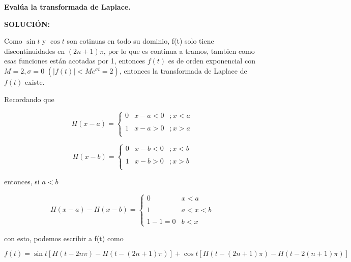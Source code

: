 \documentclass[12pt,a4paper]{article}
\begin{document}
\begin{enumerate}
    \textbf{Evalúa la transformada de Laplace.}
    
    \textbf{SOLUCIÓN:}
    
    Como $\sin{t}$ y $\cos{t}$ son cotinuas en todo su dominio, f(t) solo tiene discontinuidades en $(2n+1)\pi$, por lo que es continua a tramos, tambien como esas funciones están acotadas por 1, entonces $f(t)$ es de orden exponencial con $M=2,\sigma = 0$ $(|f(t)|<Me^{\sigma t}=2)$, entonces la transformada de Laplace de $f(t)$  existe.
    
    Recordando que 
    
    \begin{equation*}
        H(x-a)=\left\{ \begin{array}{lcc}
             0 &    x-a < 0 &; x < a \\
             \\ 1 &  x-a > 0 &; x > a\\
             \end{array}
        \right.
    \end{equation*}
    
    \begin{equation*}
        H(x-b)=\left\{ \begin{array}{lcc}
             0 &    x-b < 0 &; x < b \\
             \\ 1 &  x-b > 0 &; x > b\\
             \end{array}
        \right.
    \end{equation*}
    
    entonces, si $a<b$
    
    \begin{equation*}
        H(x-a)-H(x-b)=\left\{ \begin{array}{lcc}
             0 & x < a \\
             \\ 1  & a< x < b\\
             \\ 1-1=0 & b < x
             \end{array}
             \right.
    \end{equation*}
    
    con esto, podemos escribir a f(t) como 
    
    \begin{equation*}
        f(t)= \sin{t}[H(t-2n\pi)-H(t-(2n+1)\pi)] + \cos{t}[H(t-(2n+1)\pi)-H(t-2(n+1)\pi)]
    \end{equation*}
    

\end{enumerate}
\end{document}

